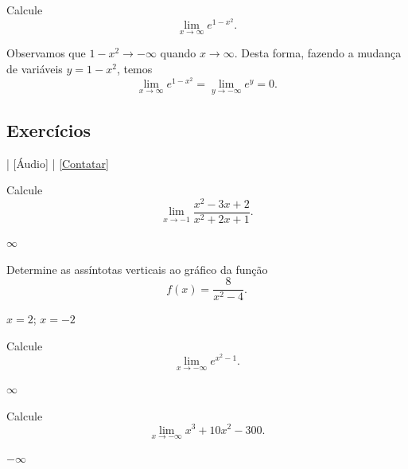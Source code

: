 \begin{exeresol}
  Calcule
  \begin{equation}
    \lim_{x\to \infty} e^{1-x^2}.
  \end{equation}
\end{exeresol}
\begin{resol}
  Observamos que $1-x^2\to -\infty$ quando $x\to \infty$. Desta forma, fazendo a mudança de variáveis $y = 1 - x^2$, temos
  \begin{equation}
    \lim_{x\to\infty} e^{1-x^2} = \lim_{y\to -\infty} e^y = 0.
  \end{equation}
\end{resol}

\subsection*{Exercícios}

\begin{flushright}
  [Vídeo] | [Áudio] | \href{https://phkonzen.github.io/notas/contato.html}{[Contatar]}
\end{flushright}

\begin{exer}
  Calcule
  \begin{equation}
    \lim_{x\to -1} \frac{x^2 - 3x + 2}{x^2 + 2x + 1}.
  \end{equation}
\end{exer}
\begin{resp}
  $\infty$
\end{resp}

\begin{exer}
  Determine as assíntotas verticais ao gráfico da função
  \begin{equation}
    f(x) = \frac{8}{x^2-4}.
  \end{equation}
\end{exer}
\begin{resp}
  $x=2$; $x=-2$
\end{resp}

\begin{exer}
  Calcule
  \begin{equation}
    \lim_{x\to -\infty} e^{x^2-1}.
  \end{equation}
\end{exer}
\begin{resp}
  $\infty$
\end{resp}

\begin{exer}
  Calcule
  \begin{equation}
    \lim_{x\to -\infty} x^3 + 10x^2 - 300.
  \end{equation}
\end{exer}
\begin{resp}
  $-\infty$
\end{resp}

